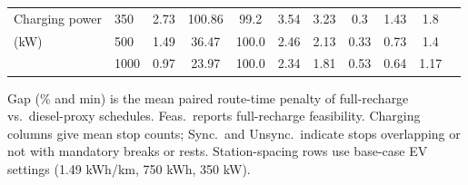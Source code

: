 \begin{table}[t]
\begin{threeparttable}
\begin{tabular}{
ll
S[table-format=1.2]
S[table-format=3.0]
S[table-format=3.1]
S[table-format=1.2]
S[table-format=1.2]
S[table-format=1.2]
S[table-format=1.2]
S[table-format=1.2]
S[table-format=1.2]
}
\addlinespace
Charging power & 350 & 2.73 & 100.86 & 99.2 & 3.54 & 3.23 & 0.3 & 1.43 & 1.8 \\
(kW) & 500 & 1.49 & 36.47 & 100.0 & 2.46 & 2.13 & 0.33 & 0.73 & 1.4 \\
 & 1000 & 0.97 & 23.97 & 100.0 & 2.34 & 1.81 & 0.53 & 0.64 & 1.17 \\
\bottomrule
\end{tabular}
\begin{tablenotes}[flushleft]
\footnotesize
\item Gap (\% and min) is the mean paired route-time penalty of full-recharge vs.\ diesel-proxy schedules. Feas.\ reports full-recharge feasibility. Charging columns give mean stop counts; Sync.\ and Unsync.\ indicate stops overlapping or not with mandatory breaks or rests. Station-spacing rows use base-case EV settings (1.49 kWh/km, 750 kWh, 350 kW).
\end{tablenotes}
\end{threeparttable}
\end{table}
